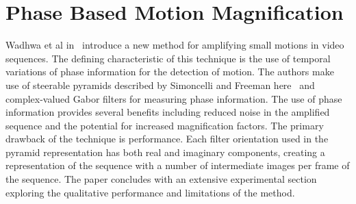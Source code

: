 \documentclass[letterpaper]{article}
\date{\today}
\begin{document}
\maketitle

\section{Phase Based Motion Magnification}
Wadhwa et al in~\cite{phase-based} introduce a new method for
amplifying small motions in video sequences.  The defining
characteristic of this technique is the use of temporal variations of
phase information for the detection of motion.  The authors make use
of steerable pyramids described by Simoncelli and Freeman
here~\cite{steer-pyr} and complex-valued Gabor filters for measuring
phase information.  The use of phase information provides several
benefits including reduced noise in the amplified sequence and the
potential for increased magnification factors.  The primary drawback
of the technique is performance.  Each filter orientation used in the
pyramid representation has both real and imaginary components, creating
a representation of the sequence with a number of intermediate images
per frame of the sequence.  The paper concludes with an extensive
experimental section exploring the qualitative performance and
limitations of the method.












\end{document}
